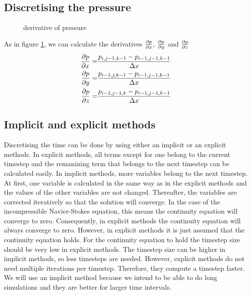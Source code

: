 \documentclass{article}
\begin{document}
\subsection{Discretising the pressure}
\begin{figure}[ht]
\centering

\caption{derivative of pressure} \label{derivative of pressure}
\end{figure}
As in figure \ref{derivative of pressure}, we can calculate the derivatives \(\pdv{p}{x}\), \(\pdv{p}{y}\) and \(\pdv{p}{z}\)
\begin{equation}
  \begin{split}
    \pdv{p}{x}=&\frac{p_{i, j-1, k-1}-p_{i-1, j-1, k-1}}{\Delta x}\\
    \pdv{p}{y}=&\frac{p_{i-1, j, k-1}-p_{i-1, j-1, k-1}}{\Delta x}\\
    \pdv{p}{z}=&\frac{p_{i-1, j-1, k}-p_{i-1, j-1, k-1}}{\Delta x}
  \end{split}
\end{equation}

\subsection{Implicit and explicit methods} \label{implicit and explicit}
Discretising the time can be done by using either an implicit or an explicit methods.\cite{enterfea} In explicit methods, all terms except for one belong to the current timestep and the remanining term that belongs to the next timestep can be calculated easily. \cite{enterfea}In implicit methods, more variables belong to the next timestep. At first, one variable is calculated in the same way as in the explicit methods and the values of the other variables are not changed. \cite{enterfea} Thereafter, the variables  are corrected iteratively so that the solution will converge. \cite{enterfea} In the case of the incompressible Navier-Stokes equation, this means the continuity equation will converge to zero. Consequently, in explicit methods the continuity equation will always converge to zero. However, in explicit methods it is just assumed that the continuity equation holds. For the continuity equation to hold the timestep size should be very low in explicit methods. \cite{enterfea} The timestep size can be higher in implicit methods, so less timesteps are needed. \cite{enterfea} However, explicit methods do not need multiple iterations per timestep. Therefore, they compute a timestep faster. \cite{enterfea}We will use an implicit method because we intend to be able to do long simulations and they are better for larger time intervals.\cite{enterfea}
\end{document}
